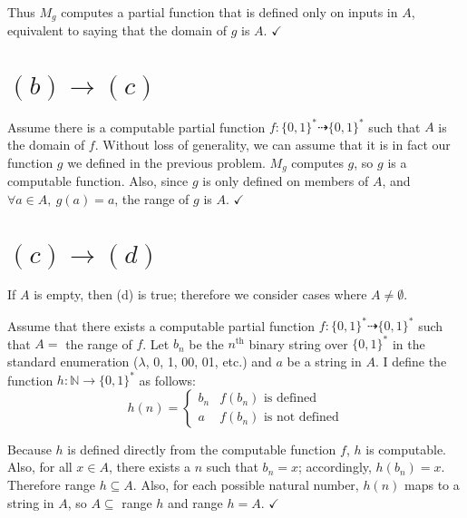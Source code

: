 \documentclass[11pt]{article}
\let\imp\rightarrow
\begin{document}
Thus $M_g$ computes a partial function that is defined only on inputs in $A$, equivalent to saying that the domain of $g$ is $A$. $\checkmark$


\section*{$(b) \imp (c)$}

Assume there is a computable partial function $f: \{0,1\}^* \dashrightarrow \{0,1\}^*$ such that $A$ is the domain of $f$.
Without loss of generality, we can assume that it is in fact our function $g$ we defined in the previous problem.
$M_g$ computes $g$, so $g$ is a computable function.
Also, since $g$ is only defined on members of $A$, and $ \forall a \in A,\ g(a) = a$, the range of $g$ is $A$. $\checkmark$


\section*{$(c) \imp (d)$}

If $A$ is empty, then (d) is true; therefore we consider cases where $A \neq \emptyset$.

Assume that there exists a computable partial function $f : \{0,1\}^* \dashrightarrow \{0,1\}^*$ such that $A = $ the range of $f$.
Let $b_n$ be the $n^{\text{th}}$ binary string over $\{0,1\}^*$ in the standard enumeration ($\lambda$, 0, 1, 00, 01, etc.) and $a$ be a string in $A$.
I define the function $h : \mathbb{N} \imp \{0,1\}^*$ as follows:
\[ h(n) =
	\begin{cases}
		b_n & f(b_n) \text{ is defined} \\
		a & f(b_n) \text{ is not defined}
	\end{cases}
\]

Because $h$ is defined directly from the computable function $f$, $h$ is computable.
Also, for all $x\in A$, there exists a $n$ such that $b_n = x$; accordingly, $h(b_n) = x$. 
Therefore range $h \subseteq A$.
Also, for each possible natural number, $h(n)$ maps to a string in $A$, so $A \subseteq $ range $h$ and range $h = A$. $\checkmark$
\end{document}
